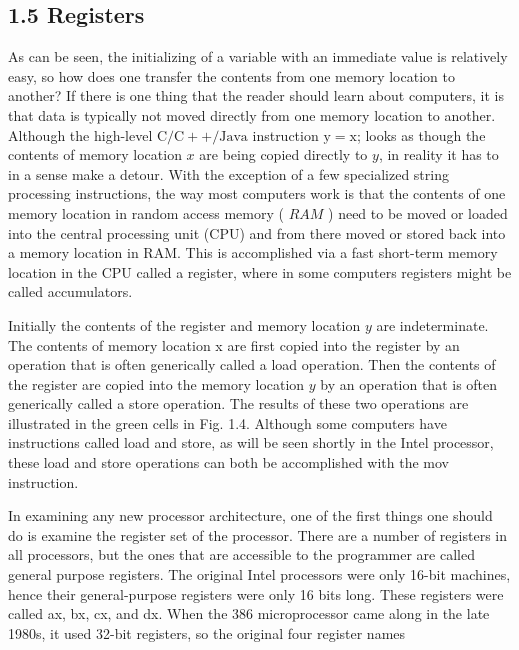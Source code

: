 \documentclass[10pt]{article}
\begin{document}
\subsection*{1.5 Registers}
As can be seen, the initializing of a variable with an immediate value is relatively easy, so how does one transfer the contents from one memory location to another? If there is one thing that the reader should learn about computers, it is that data is typically not moved directly from one memory location to another. Although the high-level $\mathrm{C} / \mathrm{C}++/ \mathrm{Java}$ instruction $\mathrm{y}=\mathrm{x}$; looks as though the contents of memory location $x$ are being copied directly to $y$, in reality it has to in a sense make a detour. With the exception of a few specialized string processing instructions, the way most computers work is that the contents of one memory location in random access memory ( $R A M$ ) need to be moved or loaded into the central processing unit (CPU) and from there moved or stored back into a memory location in RAM. This is accomplished via a fast short-term memory location in the CPU called a register, where in some computers registers might be called accumulators.

Initially the contents of the register and memory location $y$ are indeterminate. The contents of memory location x are first copied into the register by an operation that is often generically called a load operation. Then the contents of the register are copied into the memory location $y$ by an operation that is often generically called a store operation. The results of these two operations are illustrated in the green cells in Fig. 1.4. Although some computers have instructions called load and store, as will be seen shortly in the Intel processor, these load and store operations can both be accomplished with the mov instruction.

In examining any new processor architecture, one of the first things one should do is examine the register set of the processor. There are a number of registers in all processors, but the ones that are accessible to the programmer are called general purpose registers. The original Intel processors were only 16-bit machines, hence their general-purpose registers were only 16 bits long. These registers were called ax, bx, cx, and dx. When the 386 microprocessor came along in the late 1980s, it used 32-bit registers, so the original four register names
\end{document}
